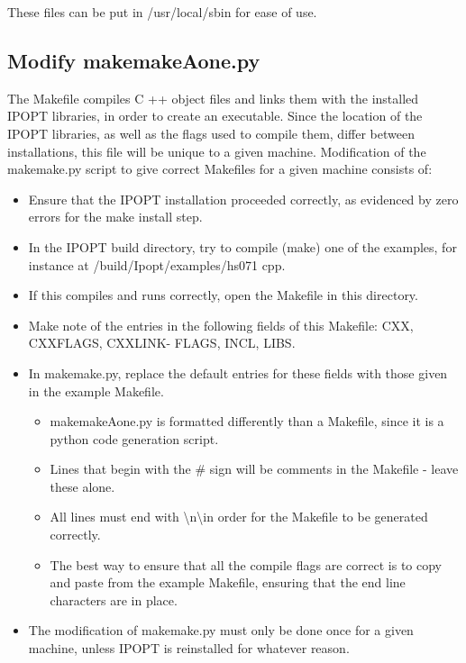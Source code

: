 \documentclass[11pt]{article}
\begin{document}
These files can be put in /usr/local/sbin for ease of use.

\subsection*{Modify makemakeAone.py}
The Makefile compiles C ++ object files and links them with the installed IPOPT libraries, in order to
create an executable. Since the location of the IPOPT libraries, as well as the flags used to compile them,
differ between installations, this file will be unique to a given machine. Modification of the makemake.py
script to give correct Makefiles for a given machine consists of:
\begin{itemize}
\item Ensure that the IPOPT installation proceeded correctly, as evidenced by zero errors for the make install step.
\item In the IPOPT build directory, try to compile (make) one of the examples, for instance at
/build/Ipopt/examples/hs071 cpp.
\item If this compiles and runs correctly, open the Makefile in this directory.
\item Make note of the entries in the following fields of this Makefile: CXX, CXXFLAGS, CXXLINK-
FLAGS, INCL, LIBS.
\item In makemake.py, replace the default entries for these fields with those given in the example Makefile.
\begin{itemize}
\item makemakeAone.py is formatted differently than a Makefile, since it is a python code generation script.
\item Lines that begin with the \# sign will be comments in the Makefile - leave these alone.
\item All lines must end with \textbackslash n\textbackslash in order for the Makefile to be generated correctly.
\item The best way to ensure that all the compile flags are correct is to copy and paste from the
example Makefile, ensuring that the end line characters are in place.
\end{itemize}
\item The modification of makemake.py must only be done once for a given machine, unless IPOPT is
reinstalled for whatever reason.
\end{itemize}
\pagebreak
\end{document}

